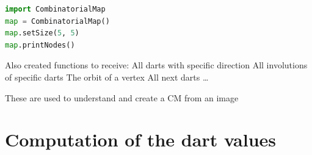 \documentclass[12pt]{article}
\begin{document}
\begin{lstlisting}[language=Python]
import CombinatorialMap
map = CombinatorialMap()
map.setSize(5, 5)
map.printNodes()
\end{lstlisting}

Also created functions to receive:
All darts with specific direction
All involutions of specific darts
The orbit of a vertex
All next darts
…

These are used to understand and create a
CM from an image


\section{Computation of the dart values} %
\label{sec:computation_of_the_dart_values}
\end{document}
